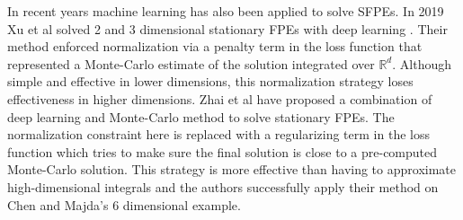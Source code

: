 In recent years machine learning has also been applied to solve SFPEs. In 2019 Xu et al solved  2 and 3 dimensional stationary FPEs with deep learning \cite{xu2020solving}. Their method enforced normalization via a penalty term in the loss function that represented a Monte-Carlo estimate of the solution integrated over $\mathbb R^d$. Although simple and effective in lower dimensions, this normalization strategy loses effectiveness in higher dimensions. Zhai et al \cite{zhai2022deep} have proposed a combination of deep learning and Monte-Carlo method to solve stationary FPEs. The normalization constraint here is replaced with a regularizing term in the loss function which tries to make sure the final solution is close to a pre-computed Monte-Carlo solution. This strategy is more effective than having to approximate high-dimensional integrals and the authors successfully apply their method on Chen and Majda's 6 dimensional example.






